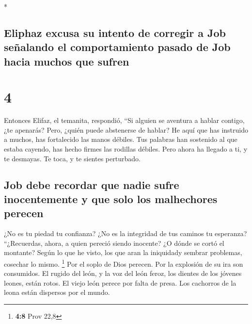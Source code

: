 \begin{paracol}{2}
\begin{otherlanguage}{english}
\end{otherlanguage}

\switchcolumn[0]*

\hypertarget{eliphaz-excusa-su-intento-de-corregir-a-job-seuxf1alando-el-comportamiento-pasado-de-job-hacia-muchos-que-sufren}{%
\subsection{Eliphaz excusa su intento de corregir a Job señalando el
comportamiento pasado de Job hacia muchos que
sufren}\label{eliphaz-excusa-su-intento-de-corregir-a-job-seuxf1alando-el-comportamiento-pasado-de-job-hacia-muchos-que-sufren}}

\hypertarget{section-6}{%
\section{4}\label{section-6}}

 Entonces Elifaz, el temanita, respondió, 
``Si alguien se aventura a hablar contigo, ¿te apenarás? Pero, ¿quién
puede abstenerse de hablar?  He aquí que has instruido a
muchos, has fortalecido las manos débiles.  Tus palabras
han sostenido al que estaba cayendo, has hecho firmes las rodillas
débiles.  Pero ahora ha llegado a ti, y te desmayas. Te
toca, y te sientes perturbado.

\hypertarget{job-debe-recordar-que-nadie-sufre-inocentemente-y-que-solo-los-malhechores-perecen}{%
\subsection{Job debe recordar que nadie sufre inocentemente y que solo
los malhechores
perecen}\label{job-debe-recordar-que-nadie-sufre-inocentemente-y-que-solo-los-malhechores-perecen}}

 ¿No es tu piedad tu confianza? ¿No es la integridad de
tus caminos tu esperanza?  ``¿Recuerdas, ahora, a quien
pereció siendo inocente? ¿O dónde se cortó el montante? 
Según lo que he visto, los que aran la iniquidady sembrar problemas,
cosechar lo mismo. \footnote{\textbf{4:8} Prov 22,8}  Por
el soplo de Dios perecen. Por la explosión de su ira son consumidos.
 El rugido del león, y la voz del león feroz, los dientes
de los jóvenes leones, están rotos.  El viejo león perece
por falta de presa. Los cachorros de la leona están dispersos por el
mundo.


\end{paracol}
